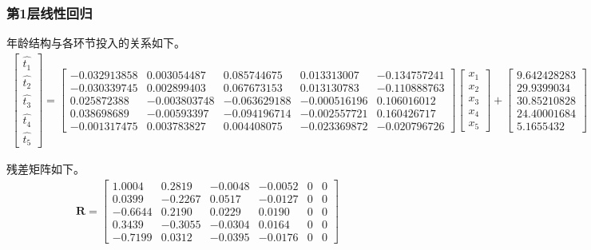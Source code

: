 \documentclass{article}
\begin{document}
\subsubsection{第1层线性回归}
年龄结构与各环节投入的关系如下。
\begin{align}
	\begin{bmatrix}
		\hat{t_1}\\
		\hat{t_2}\\
		\hat{t_3}\\
		\hat{t_4}\\
		\hat{t_5}
	\end{bmatrix}
	=
	\begin{bmatrix}
		-0.032913858 & 0.003054487  & 0.085744675  & 0.013313007  & -0.134757241 \\
		-0.030339745 & 0.002899403  & 0.067673153  & 0.013130783  & -0.110888763 \\
		0.025872388  & -0.003803748 & -0.063629188 & -0.000516196 & 0.106016012  \\
		0.038698689  & -0.00593397  & -0.094196714 & -0.002557721 & 0.160426717  \\
		-0.001317475 & 0.003783827  & 0.004408075  & -0.023369872 & -0.020796726
	\end{bmatrix}
	\begin{bmatrix}
		x_1\\
		x_2\\
		x_3\\
		x_4\\
		x_5
	\end{bmatrix}
	+
	\begin{bmatrix}
		9.642428283 \\
		29.9399034  \\
		30.85210828 \\
		24.40001684 \\
		5.1655432 
\end{bmatrix}
\end{align}
\par\indent 残差矩阵如下。
\begin{align}
	\bm{R}=
	\begin{bmatrix}
		1.0004&0.2819&-0.0048&-0.0052&0&0  \\
		0.0399&-0.2267&0.0517&-0.0127&0&0  \\
		-0.6644&0.2190&0.0229&0.0190&0&0 \\
		0.3439&-0.3055&-0.0304&0.0164&0&0  \\
		-0.7199&0.0312&-0.0395&-0.0176&0&0
	\end{bmatrix}
\end{align}
\end{document}
